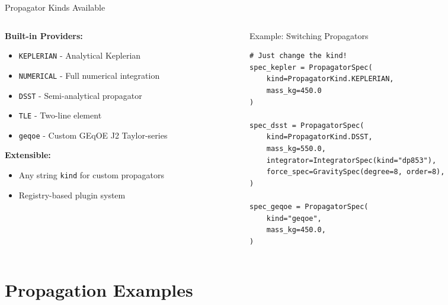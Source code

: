 \documentclass[aspectratio=169,12pt]{beamer}
\begin{document}
\begin{frame}[fragile]{Propagator Kinds Available}
    \begin{columns}
        \begin{column}{0.5\textwidth}
            \textbf{Built-in Providers:}
            \begin{itemize}
                \item \texttt{KEPLERIAN} - Analytical Keplerian
                \item \texttt{NUMERICAL} - Full numerical integration
                \item \texttt{DSST} - Semi-analytical propagator
                \item \texttt{TLE} - Two-line element
                \item \texttt{geqoe} - Custom GEqOE J2 Taylor-series
            \end{itemize}
            \textbf{Extensible:}
            \begin{itemize}
                \item Any string \texttt{kind} for custom propagators
                \item Registry-based plugin system
            \end{itemize}
        \end{column}
        \begin{column}{0.5\textwidth}
            \begin{block}{Example: Switching Propagators}
                \begin{verbatim}
# Just change the kind!
spec_kepler = PropagatorSpec(
    kind=PropagatorKind.KEPLERIAN,
    mass_kg=450.0
)

spec_dsst = PropagatorSpec(
    kind=PropagatorKind.DSST,
    mass_kg=550.0,
    integrator=IntegratorSpec(kind="dp853"),
    force_spec=GravitySpec(degree=8, order=8),
)

spec_geqoe = PropagatorSpec(
    kind="geqoe",
    mass_kg=450.0,
)
                \end{verbatim}
            \end{block}
        \end{column}
    \end{columns}
\end{frame}

\section{Propagation Examples}
\end{document}
